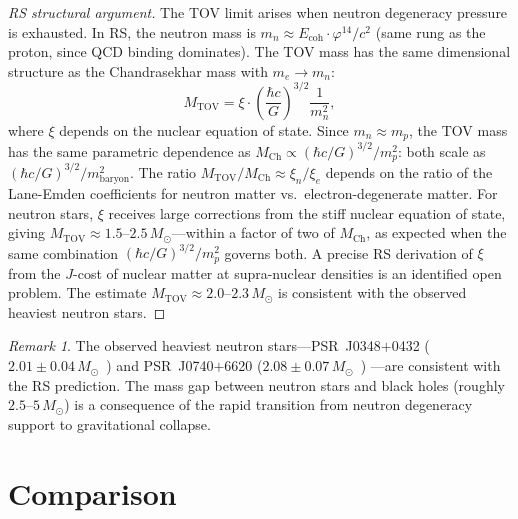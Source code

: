 \documentclass[12pt,a4paper]{article}
\theoremstyle{definition}
\theoremstyle{remark}
\newtheorem{remark}[theorem]{Remark}
\begin{document}
\begin{proof}[RS structural argument]
The TOV limit arises when neutron degeneracy pressure is
exhausted.  In RS, the neutron mass is
$m_n \approx E_{\mathrm{coh}} \cdot \varphi^{14}/c^2$ (same
rung as the proton, since QCD binding dominates).  The TOV
mass has the same dimensional structure as the Chandrasekhar
mass with $m_e \to m_n$:
\begin{equation}
  M_{\mathrm{TOV}} = \xi \cdot
  \left(\frac{\hbar c}{G}\right)^{3/2}
  \frac{1}{m_n^2},
\end{equation}
where $\xi$ depends on the nuclear equation of state.  Since
$m_n \approx m_p$, the TOV mass has the same parametric dependence
as $M_{\mathrm{Ch}} \propto (\hbar c/G)^{3/2}/m_p^2$: both scale
as $(\hbar c/G)^{3/2}/m_{\mathrm{baryon}}^2$.  The ratio
$M_{\mathrm{TOV}}/M_{\mathrm{Ch}} \approx \xi_n/\xi_e$ depends on
the ratio of the Lane-Emden coefficients for neutron matter vs.\
electron-degenerate matter.  For neutron stars, $\xi$ receives large
corrections from the stiff nuclear equation of state, giving
$M_{\mathrm{TOV}} \approx 1.5$--$2.5\,M_\odot$---within a factor
of two of $M_{\mathrm{Ch}}$, as expected when the same combination
$(\hbar c/G)^{3/2}/m_p^2$ governs both.
A precise RS derivation of $\xi$ from the $J$-cost of nuclear
matter at supra-nuclear densities is an identified open problem.
The estimate $M_{\mathrm{TOV}} \approx 2.0\text{--}2.3\,M_\odot$
is consistent with the observed heaviest neutron stars.
\end{proof}

\begin{remark}
The observed heaviest neutron stars---PSR~J0348$+$0432
($2.01 \pm 0.04\,M_\odot$~\cite{Demorest2010}) and
PSR~J0740$+$6620 ($2.08 \pm 0.07\,M_\odot$~\cite{Cromartie2020})
---are consistent with the RS prediction.  The mass gap between
neutron stars and black holes (roughly $2.5$--$5\,M_\odot$) is
a consequence of the rapid transition from neutron degeneracy
support to gravitational collapse.
\end{remark}

\section{Comparison}
\label{sec:comparison}
\end{document}
